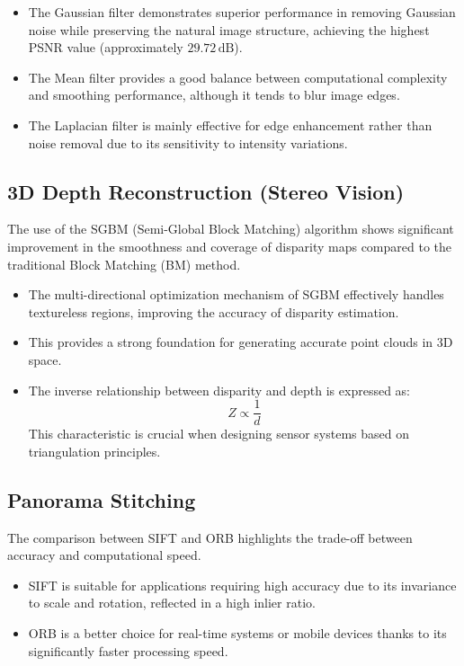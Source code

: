 \documentclass[a4paper,12pt]{article}
\begin{document}
\begin{itemize}
    \item The Gaussian filter demonstrates superior performance in removing Gaussian noise while preserving the natural image structure, achieving the highest PSNR value (approximately $29.72\,\mathrm{dB}$).
    \item The Mean filter provides a good balance between computational complexity and smoothing performance, although it tends to blur image edges.
    \item The Laplacian filter is mainly effective for edge enhancement rather than noise removal due to its sensitivity to intensity variations.
\end{itemize}

\subsection{3D Depth Reconstruction (Stereo Vision)}
The use of the SGBM (Semi-Global Block Matching) algorithm shows significant improvement in the smoothness and coverage of disparity maps compared to the traditional Block Matching (BM) method.

\begin{itemize}
    \item The multi-directional optimization mechanism of SGBM effectively handles textureless regions, improving the accuracy of disparity estimation.
    \item This provides a strong foundation for generating accurate point clouds in 3D space.
    \item The inverse relationship between disparity and depth is expressed as:
    \[
        Z \propto \frac{1}{d}
    \]
    This characteristic is crucial when designing sensor systems based on triangulation principles.
\end{itemize}

\subsection{Panorama Stitching}
The comparison between SIFT and ORB highlights the trade-off between accuracy and computational speed.

\begin{itemize}
    \item SIFT is suitable for applications requiring high accuracy due to its invariance to scale and rotation, reflected in a high inlier ratio.
    \item ORB is a better choice for real-time systems or mobile devices thanks to its significantly faster processing speed.
\end{itemize}
\end{document}
